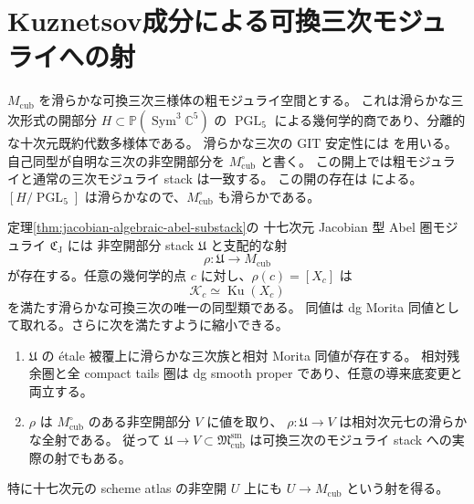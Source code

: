 \section{Kuznetsov成分による可換三次モジュライへの射}
\label{sec:kuznetsov-moduli-morphism}

$M_{\mathrm{cub}}$ を滑らかな可換三次三様体の粗モジュライ空間とする。
これは滑らかな三次形式の開部分 $H\subset\mathbb P(\operatorname{Sym}^3\mathbb C^5)$
の $\operatorname{PGL}_5$ による幾何学的商であり、分離的な十次元既約代数多様体である。
滑らかな三次の GIT 安定性には \cite[Theorem~1.1]{AllcockCubicGIT} を用いる。
自己同型が自明な三次の非空開部分を $M_{\mathrm{cub}}^\circ$ と書く。
この開上では粗モジュライと通常の三次モジュライ stack は一致する。
この開の存在は \cite[Theorems~1.5--1.6 and Corollary~1.9]{PoonenHypersurfaceAut}
による。$[H/\operatorname{PGL}_5]$ は滑らかなので、$M_{\mathrm{cub}}^\circ$ も滑らかである。

\begin{theorem}[十七次元から十次元への残余射]
\label{thm:kuznetsov-cubic-moduli-morphism}
定理\ref{thm:jacobian-algebraic-abel-substack}の
十七次元 Jacobian 型 Abel 圏モジュライ $\mathfrak C_{\mathrm J}$ には
非空開部分 stack $\mathfrak U$ と支配的な射
\begin{equation}\label{eq:kuznetsov-seventeen-ten}
 \rho:\mathfrak U\longrightarrow M_{\mathrm{cub}}
\end{equation}
が存在する。任意の幾何学的点 $c$ に対し、$\rho(c)=[X_c]$ は
\[
 \mathcal K_c\simeq\operatorname{Ku}(X_c)
\]
を満たす滑らかな可換三次の唯一の同型類である。
同値は dg Morita 同値として取れる。さらに次を満たすように縮小できる。
\begin{enumerate}
\item $\mathfrak U$ の étale 被覆上に滑らかな三次族と相対 Morita 同値が存在する。
相対残余圏と全 compact tails 圏は dg smooth proper であり、任意の導来底変更と両立する。
\item $\rho$ は $M_{\mathrm{cub}}^\circ$ のある非空開部分 $V$ に値を取り、
$\rho:\mathfrak U\to V$ は相対次元七の滑らかな全射である。
従って $\mathfrak U\to V\subset\mathfrak M_{\mathrm{cub}}^{\mathrm{sm}}$
は可換三次のモジュライ stack への実際の射でもある。
\end{enumerate}
特に十七次元の scheme atlas の非空開 $U$ 上にも
$U\to M_{\mathrm{cub}}$ という射を得る。
\end{theorem}

